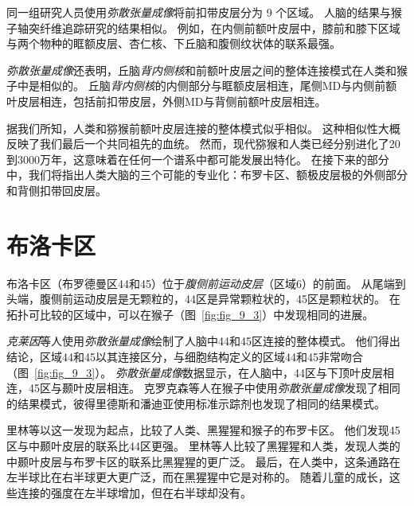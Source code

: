 同一组研究人员使用\textit{弥散张量成像}将前扣带皮层分为 9 个区域\cite{beckmann2009connectivity}。
人脑的结果与猴子轴突纤维追踪研究的结果相似\cite{carmichael1994architectonic}。
例如，在内侧前额叶皮层中，膝前和膝下区域与两个物种的眶额皮层、杏仁核、下丘脑和腹侧纹状体的联系最强。
\par


\textit{弥散张量成像}还表明，丘脑\textit{背内侧核}和前额叶皮层之间的整体连接模式在人类和猴子中是相似的\cite{klein2010topography}。
丘脑\textit{背内侧核}的内侧部分与眶额皮层相连，尾侧MD与内侧前额叶皮层相连，包括前扣带皮层，外侧MD与背侧前额叶皮层相连。
\par


据我们所知，人类和猕猴前额叶皮层连接的整体模式似乎相似。
这种相似性大概反映了我们最后一个共同祖先的血统。
然而，现代猕猴和人类已经分别进化了20到3000万年，这意味着在任何一个谱系中都可能发展出特化。
在接下来的部分中，我们将指出人类大脑的三个可能的专业化：布罗卡区、额极皮层极的外侧部分和背侧扣带回皮层。



\section{布洛卡区}

布洛卡区（布罗德曼区44和45）位于\textit{腹侧前运动皮层}（区域6）的前面。
从尾端到头端，腹侧前运动皮层是无颗粒的，44区是异常颗粒状的，45区是颗粒状的\cite{petrides2005orofacial}。
在拓扑可比较的区域中，可以在猴子（图~\ref{fig:fig_9_3}）中发现相同的进展。
\par


\textit{克莱因}等人\cite{klein2007connectivity}使用\textit{弥散张量成像}绘制了人脑中44和45区连接的整体模式。
他们得出结论，区域44和45以其连接区分，与细胞结构定义的区域44和45非常吻合（图~\ref{fig:fig_9_3}）。
\textit{弥散张量成像}数据显示，在人脑中，44区与下顶叶皮层相连，45区与颞叶皮层相连\cite{frey2008dissociating}。
克罗克森等人\cite{croxson2005quantitative}在猴子中使用\textit{弥散张量成像}发现了相同的结果模式，彼得里德斯和潘迪亚\cite{petrides2009distinct}使用标准示踪剂也发现了相同的结果模式。
\par


里林等\cite{rilling2008evolution}以这一发现为起点，比较了人类、黑猩猩和猴子的布罗卡区。
他们发现45区与中颞叶皮层的联系比44区更强。
里林等人比较了黑猩猩和人类，发现人类的中颞叶皮层与布罗卡区的联系比黑猩猩的更广泛。
最后，在人类中，这条通路在左半球比在右半球更大更广泛，而在黑猩猩中它是对称的。
随着儿童的成长，这些连接的强度在左半球增加，但在右半球却没有\cite{paus1999structural}。
\par


